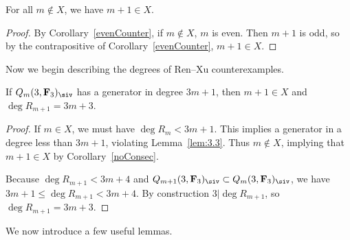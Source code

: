 \begin{Corollary}\label{noConsec}
 For all $m\not\in X$, we have $m+1\in X$.
\end{Corollary}
\begin{proof}
 By Corollary~\ref{evenCounter}, if $m\not\in X$, $m$ is even. Then $m+1$ is odd, so by the contrapositive of Corollary~\ref{evenCounter}, $m+1\in X$.
\end{proof}

Now we begin describing the degrees of Ren--Xu counterexamples.

\begin{Lemma} \label{countEx3m+3}
 If $Q_m(3,\mathbf{F}_3)_{\siv}$ has a generator in degree $3m+1$, then $m+1\in X$ and $\deg R_{m+1}=3m+3$.
\end{Lemma}
\begin{proof}
 If $m\in X$, we must have $\deg R_m<3m+1$. This implies a generator in a degree less than $3m+1$, violating Lemma~\ref{lem:3.3}. Thus $m\not\in X$, implying that $m+1\in X$ by Corollary~\ref{noConsec}.

 Because $\deg R_{m+1}<3m+4$ and $Q_{m+1}(3,\mathbf{F}_3)_\siv\subset Q_{m}(3,\mathbf{F}_3)_\siv$, we have $3m+1\leq\deg R_{m+1}< 3m+4$. By construction $3|\deg R_{m+1}$, so $\deg R_{m+1}= 3m+3$.
\end{proof}

We now introduce a few useful lemmas.

